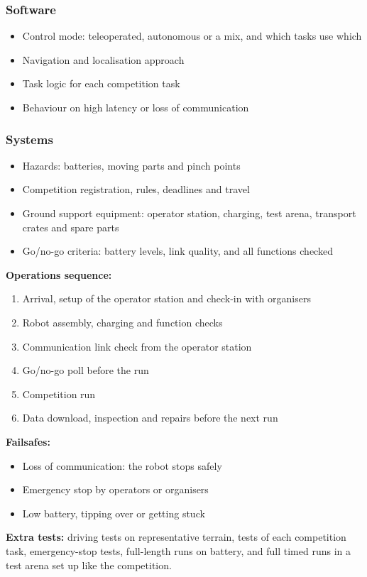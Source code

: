 \documentclass{../../Common/Latex/Templates/rapport}
\begin{document}
\subsubsection*{Software}
\begin{itemize}
  \item Control mode: teleoperated, autonomous or a mix, and which tasks use which
  \item Navigation and localisation approach
  \item Task logic for each competition task
  \item Behaviour on high latency or loss of communication
\end{itemize}

\subsubsection*{Systems}
\begin{itemize}
  \item Hazards: batteries, moving parts and pinch points
  \item Competition registration, rules, deadlines and travel
  \item Ground support equipment: operator station, charging, test arena, transport crates and spare parts
  \item Go/no-go criteria: battery levels, link quality, and all functions checked
\end{itemize}

\noindent\textbf{Operations sequence:}
\begin{enumerate}
  \item Arrival, setup of the operator station and check-in with organisers
  \item Robot assembly, charging and function checks
  \item Communication link check from the operator station
  \item Go/no-go poll before the run
  \item Competition run
  \item Data download, inspection and repairs before the next run
\end{enumerate}

\noindent\textbf{Failsafes:}
\begin{itemize}
  \item Loss of communication: the robot stops safely
  \item Emergency stop by operators or organisers
  \item Low battery, tipping over or getting stuck
\end{itemize}

\noindent\textbf{Extra tests:} driving tests on representative terrain, tests of each competition task, emergency-stop tests, full-length runs on battery, and full timed runs in a test arena set up like the competition.
\end{document}
